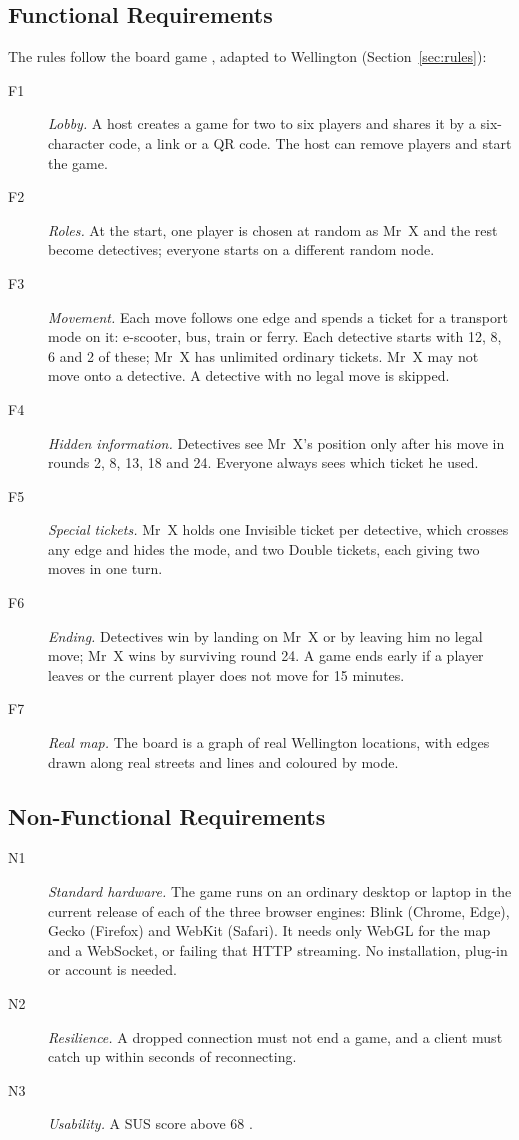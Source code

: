 \documentclass[lettersize,journal]{IEEEtran}
\begin{document}
\subsection{Functional Requirements}
The rules follow the board game \cite{rules_1983}, adapted to Wellington (Section~\ref{sec:rules}):
\begin{description}
	\item[F1] \emph{Lobby.} A host creates a game for two to six players and shares it by a six-character code, a link or a QR code. The host can remove players and start the game.
	\item[F2] \emph{Roles.} At the start, one player is chosen at random as Mr~X and the rest become detectives; everyone starts on a different random node.
	\item[F3] \emph{Movement.} Each move follows one edge and spends a ticket for a transport mode on it: e-scooter, bus, train or ferry. Each detective starts with 12, 8, 6 and 2 of these; Mr~X has unlimited ordinary tickets. Mr~X may not move onto a detective. A detective with no legal move is skipped.
	\item[F4] \emph{Hidden information.} Detectives see Mr~X's position only after his move in rounds 2, 8, 13, 18 and 24. Everyone always sees which ticket he used.
	\item[F5] \emph{Special tickets.} Mr~X holds one Invisible ticket per detective, which crosses any edge and hides the mode, and two Double tickets, each giving two moves in one turn.
	\item[F6] \emph{Ending.} Detectives win by landing on Mr~X or by leaving him no legal move; Mr~X wins by surviving round 24. A game ends early if a player leaves or the current player does not move for 15 minutes.
	\item[F7] \emph{Real map.} The board is a graph of real Wellington locations, with edges drawn along real streets and lines and coloured by mode.
\end{description}

\subsection{Non-Functional Requirements}
\begin{description}
	\item[N1] \emph{Standard hardware.} The game runs on an ordinary desktop or laptop in the current release of each of the three browser engines: Blink (Chrome, Edge), Gecko (Firefox) and WebKit (Safari). It needs only WebGL for the map and a WebSocket, or failing that HTTP streaming. No installation, plug-in or account is needed.
	\item[N2] \emph{Resilience.} A dropped connection must not end a game, and a client must catch up within seconds of reconnecting.
	\item[N3] \emph{Usability.} A SUS score above 68 \cite{sauro2011sus}.
\end{description}
\end{document}
